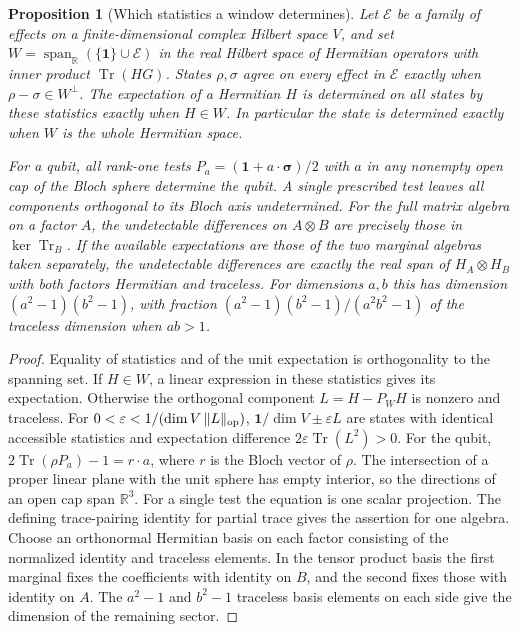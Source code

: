 \documentclass[aps,pra,onecolumn,superscriptaddress,nofootinbib,10pt]{revtex4-2}
\newtheorem{proposition}[theorem]{Proposition}
\theoremstyle{definition}
\theoremstyle{remark}
\begin{document}
\begin{proposition}[Which statistics a window determines]\label{ob:effectwindow}
Let \(\mathcal E\) be a family of effects on a finite-dimensional complex
Hilbert space \(V\), and set \(W=\operatorname{span}_{\mathbb R}
(\{\mathbf1\}\cup\mathcal E)\) in the real Hilbert space of Hermitian operators
with inner product \(\operatorname{Tr}(HG)\). States \(\rho,\sigma\) agree on
every effect in \(\mathcal E\) exactly when \(\rho-\sigma\in W^\perp\).
The expectation of a Hermitian \(H\) is determined on all states by these
statistics exactly when \(H\in W\). In particular the state is determined
exactly when \(W\) is the whole Hermitian space.

For a qubit, all rank-one tests \(P_a=(\mathbf1+a\cdot\boldsymbol\sigma)/2\)
with \(a\) in any nonempty open cap of the Bloch sphere determine the qubit.
A single prescribed test leaves all components orthogonal to its Bloch
axis undetermined. For the full matrix algebra on a factor \(A\), the
undetectable differences on \(A\otimes B\) are precisely those in
\(\ker\operatorname{Tr}_B\). If the available expectations are those
of the two marginal algebras taken separately, the undetectable
differences are exactly the real span of \(H_A\otimes H_B\) with
both factors Hermitian and traceless. For dimensions \(a,b\)
this has dimension \((a^2-1)(b^2-1)\), with fraction
\((a^2-1)(b^2-1)/(a^2b^2-1)\) of the traceless dimension when \(ab>1\).
\end{proposition}
\begin{proof}
Equality of statistics and of the unit expectation is orthogonality to
the spanning set. If \(H\in W\), a linear expression in these statistics
gives its expectation. Otherwise the orthogonal component
\(L=H-P_WH\) is nonzero and traceless. For
\(0<\varepsilon<1/(\dim V\,\lVert L\rVert_{\rm op})\),
\(\mathbf1/\dim V\pm\varepsilon L\) are states with identical accessible
statistics and expectation difference \(2\varepsilon\operatorname{Tr}(L^2)>0\).
For the qubit, \(2\operatorname{Tr}(\rho P_a)-1=r\cdot a\), where \(r\) is
the Bloch vector of \(\rho\). The intersection of a proper linear plane
with the unit sphere has empty interior, so the directions of an open
cap span \(\mathbb R^3\). For a single test the equation is one scalar
projection. The defining trace-pairing identity for partial trace gives
the assertion for one algebra. Choose an orthonormal Hermitian basis on
each factor consisting of the normalized identity and traceless
elements. In the tensor product basis the first marginal fixes the
coefficients with identity on \(B\), and the second fixes those with
identity on \(A\). The \(a^2-1\) and \(b^2-1\) traceless basis
elements on each side give the dimension of the remaining sector.
\end{proof}
\end{document}
